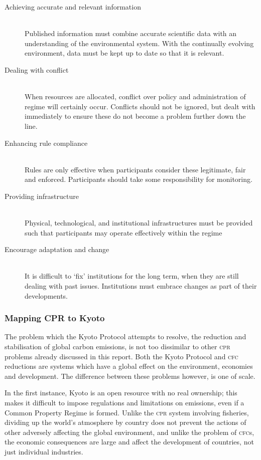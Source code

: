 \begin{description}
	\item[Achieving accurate and relevant information] \hfill \\
	Published information must combine accurate scientific data with an understanding of the environmental system. With the continually evolving environment, data must be kept up to date so that it is relevant. 
	
	\item[Dealing with conflict] \hfill \\
	When resources are allocated, conflict over policy and administration of regime will certainly occur. Conflicts should not be ignored, but dealt with immediately to ensure these do not become a problem further down the line. 

	\item[Enhancing rule compliance] \hfill \\
	Rules are only effective when participants consider these legitimate, fair and enforced. Participants should take some responsibility for monitoring.
	
	\item[Providing infrastructure] \hfill \\
	Physical, technological, and institutional infrastructures must be provided such that participants may operate effectively within the regime
	
	\item[Encourage adaptation and change] \hfill \\
	It is difficult to `fix' institutions for the long term, when they are still dealing with past issues. Institutions must embrace changes as part of their developments.
\end{description}

\subsubsection{Mapping CPR to Kyoto}

The problem which the Kyoto Protocol attempts to resolve, the reduction and stabilisation of global carbon emissions, is not too dissimilar to other \textsc{cpr} problems already discussed in this report. Both the Kyoto Protocol and \textsc{cfc} reductions are  systems which have a global effect on the environment, economies and development. The difference between these problems however, is one of scale.

In the first instance, Kyoto is an open resource with no real ownership; this makes it difficult to impose regulations and limitations on emissions, even if a Common Property Regime is formed. Unlike the \textsc{cpr} system involving fisheries, dividing up the world’s atmosphere by country does not prevent the actions of other adversely affecting the global environment, and unlike the problem of \textsc{cfc}s, the economic consequences are large and affect the development of countries, not just individual industries.

